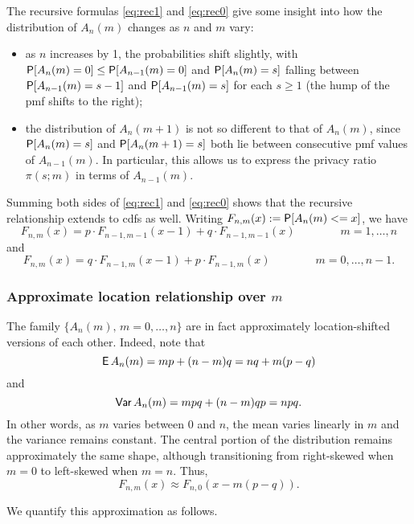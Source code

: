 \documentclass[11pt,draft]{article}
\begin{document}
The recursive formulas \eqref{eq:rec1} and \eqref{eq:rec0} give some insight into how the distribution of $A_n(m)$ changes as $n$ and $m$ vary:
\begin{itemize}
\item  as $n$ increases by 1, the probabilities shift slightly, with $\P[A_n(m) = 0] \leq \P[A_{n-1}(m) = 0]$ and
$\P[A_n(m) = s]$ falling between $\P[A_{n-1}(m) = s-1]$ and $\P[A_{n-1}(m) = s]$ for each $s\geq 1$ (\ie the hump of the pmf shifts to the right);
\item the distribution of $A_n(m+1)$ is not so different to that of $A_n(m)$, since $\P[A_n(m) = s]$ and $\P[A_n(m+1) = s]$ both lie between consecutive pmf values of $A_{n-1}(m)$. In particular, this allows us to express the privacy ratio $\pi(s;m)$ in terms of $A_{n-1}(m)$.
\end{itemize}

Summing both sides of \eqref{eq:rec1} and \eqref{eq:rec0} shows that the recursive relationship extends to cdfs as well.
Writing $F_{n,m}(x) := \P[A_n(m) <= x]$, we have
\begin{equation*}%
F_{n,m}(x) = p\cdot F_{n-1,m-1}(x-1) + q\cdot F_{n-1,m-1}(x)
\qquad\qquad m = 1,\dots,n
\end{equation*}
and 
\begin{equation*}%
F_{n,m}(x) = q\cdot F_{n-1,m}(x-1) + p\cdot F_{n-1,m}(x)
\qquad\qquad m = 0,\dots,n-1.
\end{equation*}


\subsubsection{Approximate location relationship over $m$}

The family $\{A_n(m),\, m = 0,\dots,n\}$ are in fact approximately location-shifted versions of each other.
Indeed, note that
\[ \EP A_n(m) = mp + (n-m)q = nq + m(p-q) \]
and
\[ \Var A_n(m) = mpq + (n-m)qp = npq. \]
In other words, as $m$ varies between $0$ and $n$, the mean varies linearly in $m$ and the variance remains constant.
The central portion of the distribution remains approximately the same shape, although transitioning from right-skewed when $m=0$ to left-skewed when $m=n$.
Thus, 
\[ F_{n,m}(x) \approx F_{n,0}(x - m(p-q)). \]

We quantify this approximation as follows.
\end{document}
